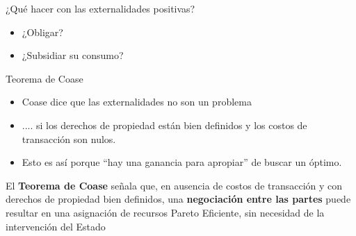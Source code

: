 \documentclass{beamer}
\begin{document}
\begin{frame}{¿Qué hacer con las externalidades positivas?}
    \begin{itemize}
        \item ¿Obligar?
        \item ¿Subsidiar su consumo?
    \end{itemize}
\end{frame}

\begin{frame}{Teorema de Coase}
    \begin{itemize}
        \item Coase dice que las externalidades no son un problema
        \item .... si los derechos de propiedad están bien definidos y los costos de transacción son nulos.
        \item Esto es así porque ``hay una ganancia para apropiar'' de buscar un óptimo.
    \end{itemize}
        \begin{boxB}
        \centering
        El \textbf{Teorema de Coase} señala que, en ausencia de costos de transacción y con derechos de propiedad bien definidos, una \textbf{negociación entre las partes }puede resultar en una asignación de recursos Pareto Eficiente, sin necesidad de la intervención del Estado
        \end{boxB}
\end{frame}
\end{document}

